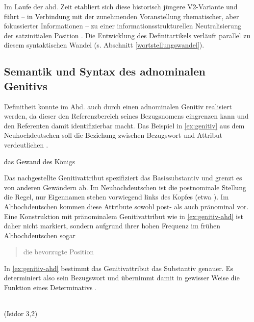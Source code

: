 Im Laufe der ahd. Zeit etabliert sich diese historisch jüngere V2-Variante und führt -- in Verbindung mit der zunehmenden Voranstellung rhematischer, aber fokussierter Informationen -- zu einer informationsstrukturellen Neutralisierung der satzinitialen Position \parencite[s.][323]{Hinterholzl2010}. Die Entwicklung des Definitartikels verläuft parallel zu diesem syntaktischen Wandel (s. Abschnitt \ref{wortstellungswandel}). 

\subsection{Semantik und Syntax des adnominalen Genitivs} \label{sec:genitiv}

Definitheit konnte im Ahd. auch durch einen adnominalen Genitiv realisiert werden, da dieser den Referenzbereich seines Bezugsnomens eingrenzen kann und den Referenten damit identifizierbar macht. Das Beispiel in \ref{ex:genitiv} aus dem Neuhochdeutschen soll die Beziehung zwischen Bezugswort und Attribut verdeutlichen \parencite[s. auch][67f.]{Szczepaniak2011a}. 
  
\begin{exe}
	\ex \label{ex:genitiv}   
	das Gewand des Königs
\end{exe}

\noindent
Das nachgestellte Genitivattribut  spezifiziert das Basissubstantiv   und grenzt es von anderen Gewändern ab. Im Neuhochdeutschen ist die postnominale Stellung die Regel, nur Eigennamen stehen vorwiegend links des Kopfes (etwa ). Im Althochdeutschen kommen diese Attribute sowohl post- als auch pränominal vor. Eine Konstruktion mit pränominalem Genitivattribut wie in \ref{ex:genitiv-ahd} ist daher nicht markiert, sondern aufgrund ihrer hohen Frequenz im frühen Althochdeutschen sogar  \blockcquote[231]{Oubouzar1997}{die bevorzugte Position}. In \ref{ex:genitiv-ahd} bestimmt das Genitivattribut  das Substantiv  genauer. Es determiniert also sein Bezugswort und übernimmt damit in gewisser Weise die Funktion eines Determinativs  \parencite[236]{Oubouzar1997}.

\begin{exe}
	\ex \label{ex:genitiv-ahd}   
	   \\
	 (Isidor 3,2)
\end{exe}
	
